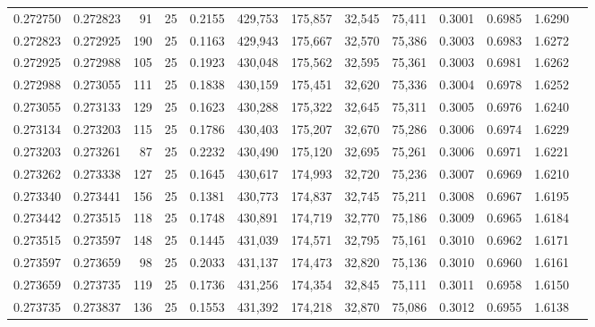 \begin{tabular}{rrrrrrrrrrrrr}
0.272750 & 0.272823 &    91 &  25 &                                     0.2155 & 429,753 & 175,857 &  32,545 &  75,411 & 0.3001 & 0.6985 & 1.6290 \\
0.272823 & 0.272925 &   190 &  25 &                                     0.1163 & 429,943 & 175,667 &  32,570 &  75,386 & 0.3003 & 0.6983 & 1.6272 \\
0.272925 & 0.272988 &   105 &  25 &                                     0.1923 & 430,048 & 175,562 &  32,595 &  75,361 & 0.3003 & 0.6981 & 1.6262 \\
0.272988 & 0.273055 &   111 &  25 &                                     0.1838 & 430,159 & 175,451 &  32,620 &  75,336 & 0.3004 & 0.6978 & 1.6252 \\
0.273055 & 0.273133 &   129 &  25 &                                     0.1623 & 430,288 & 175,322 &  32,645 &  75,311 & 0.3005 & 0.6976 & 1.6240 \\
0.273134 & 0.273203 &   115 &  25 &                                     0.1786 & 430,403 & 175,207 &  32,670 &  75,286 & 0.3006 & 0.6974 & 1.6229 \\
0.273203 & 0.273261 &    87 &  25 &                                     0.2232 & 430,490 & 175,120 &  32,695 &  75,261 & 0.3006 & 0.6971 & 1.6221 \\
0.273262 & 0.273338 &   127 &  25 &                                     0.1645 & 430,617 & 174,993 &  32,720 &  75,236 & 0.3007 & 0.6969 & 1.6210 \\
0.273340 & 0.273441 &   156 &  25 &                                     0.1381 & 430,773 & 174,837 &  32,745 &  75,211 & 0.3008 & 0.6967 & 1.6195 \\
0.273442 & 0.273515 &   118 &  25 &                                     0.1748 & 430,891 & 174,719 &  32,770 &  75,186 & 0.3009 & 0.6965 & 1.6184 \\
0.273515 & 0.273597 &   148 &  25 &                                     0.1445 & 431,039 & 174,571 &  32,795 &  75,161 & 0.3010 & 0.6962 & 1.6171 \\
0.273597 & 0.273659 &    98 &  25 &                                     0.2033 & 431,137 & 174,473 &  32,820 &  75,136 & 0.3010 & 0.6960 & 1.6161 \\
0.273659 & 0.273735 &   119 &  25 &                                     0.1736 & 431,256 & 174,354 &  32,845 &  75,111 & 0.3011 & 0.6958 & 1.6150 \\
0.273735 & 0.273837 &   136 &  25 &                                     0.1553 & 431,392 & 174,218 &  32,870 &  75,086 & 0.3012 & 0.6955 & 1.6138 \\

\end{tabular}
